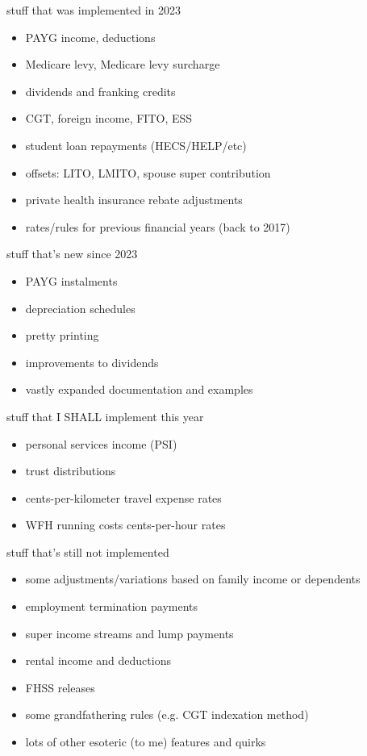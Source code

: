\documentclass[ignorenonframetext,aspectratio=169,12pt]{beamer}
\begin{document}
\begin{frame}{stuff that was implemented in 2023}
\begin{itemize}
  \item PAYG income, deductions
  \item Medicare levy, Medicare levy surcharge
  \item dividends and franking credits
  \item CGT, foreign income, FITO, ESS
  \item student loan repayments (HECS/HELP/etc)
  \item offsets: LITO, LMITO, spouse super contribution
  \item private health insurance rebate adjustments
  \item rates/rules for previous financial years (back to 2017)
\end{itemize}
\end{frame}

\begin{frame}{stuff that's new since 2023}
\begin{itemize}
  \item PAYG instalments
  \item depreciation schedules
  \item pretty printing
  \item improvements to dividends
  \item vastly expanded documentation and examples
\end{itemize}
\end{frame}

\begin{frame}{stuff that I SHALL implement this year}
\begin{itemize}
  \item personal services income (PSI)
  \item trust distributions
  \item cents-per-kilometer travel expense rates
  \item WFH running costs cents-per-hour rates
\end{itemize}
\end{frame}

\begin{frame}{stuff that's still not implemented}
\begin{itemize}
  \item some adjustments/variations based on family income or dependents
  \item employment termination payments
  \item super income streams and lump payments
  \item rental income and deductions
  \item FHSS releases
  \item some grandfathering rules (e.g. CGT indexation method)
  \item lots of other esoteric (to me) features and quirks
\end{itemize}
\end{frame}
\end{document}
